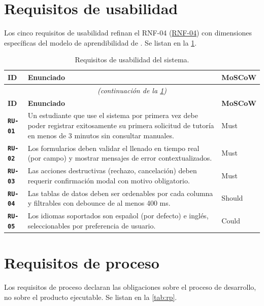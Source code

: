 \documentclass[11pt,a4paper,twoside]{report}
\newcommand{\reqid}[1]{\texttt{\textbf{#1}}}
\newcommand{\rnf}[1]{\hyperref[rnf:#1]{RNF-#1}}
\begin{document}
\section{Requisitos de usabilidad}
\label{sec:ru}

Los cinco requisitos de usabilidad refinan el RNF-04 (\rnf{04}) con dimensiones espec\'ificas del modelo de aprendibilidad de \cite{iso25010}. Se listan en la \cref{tab:ru}.

\begin{longtable}{@{}p{1.2cm}p{12.5cm}p{1.3cm}@{}}
    \caption{Requisitos de usabilidad del sistema.}
    \label{tab:ru}\\
    \toprule
    \textbf{ID} & \textbf{Enunciado} & \textbf{MoSCoW} \\
    \midrule
    \endfirsthead
    \multicolumn{3}{c}{\itshape (continuaci\'on de la \cref{tab:ru})}\\
    \toprule
    \textbf{ID} & \textbf{Enunciado} & \textbf{MoSCoW} \\
    \midrule
    \endhead

    \reqid{RU-01} & Un estudiante que use el sistema por primera vez debe poder registrar exitosamente su primera solicitud de tutor\'ia en menos de 3 minutos sin consultar manuales. & Must \\
    \reqid{RU-02} & Los formularios deben validar el llenado en tiempo real (por campo) y mostrar mensajes de error contextualizados. & Must \\
    \reqid{RU-03} & Las acciones destructivas (rechazo, cancelaci\'on) deben requerir confirmaci\'on modal con motivo obligatorio. & Must \\
    \reqid{RU-04} & Las tablas de datos deben ser ordenables por cada columna y filtrables con debounce de al menos 400 ms. & Should \\
    \reqid{RU-05} & Los idiomas soportados son espa\~nol (por defecto) e ingl\'es, seleccionables por preferencia de usuario. & Could \\
    \bottomrule
\end{longtable}

\section{Requisitos de proceso}
\label{sec:rp}

Los requisitos de proceso declaran las obligaciones sobre el proceso de desarrollo, no sobre el producto ejecutable. Se listan en la \cref{tab:rp}.
\end{document}
